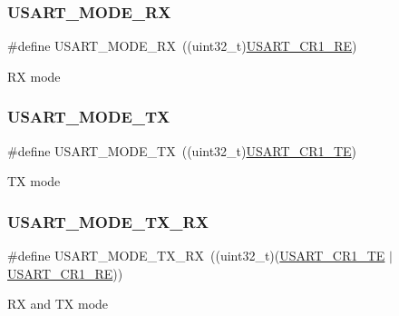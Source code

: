\subsubsection{\texorpdfstring{U\+S\+A\+R\+T\+\_\+\+M\+O\+D\+E\+\_\+\+RX}{USART\_MODE\_RX}}
{\footnotesize\ttfamily \#define U\+S\+A\+R\+T\+\_\+\+M\+O\+D\+E\+\_\+\+RX~((uint32\+\_\+t)\hyperlink{group___peripheral___registers___bits___definition_gada0d5d407a22264de847bc1b40a17aeb}{U\+S\+A\+R\+T\+\_\+\+C\+R1\+\_\+\+RE})}

RX mode \mbox{\label{group___u_s_a_r_t___mode_ga7a2fcdc3486d2675cc147811b996eb16}} 
\subsubsection{\texorpdfstring{U\+S\+A\+R\+T\+\_\+\+M\+O\+D\+E\+\_\+\+TX}{USART\_MODE\_TX}}
{\footnotesize\ttfamily \#define U\+S\+A\+R\+T\+\_\+\+M\+O\+D\+E\+\_\+\+TX~((uint32\+\_\+t)\hyperlink{group___peripheral___registers___bits___definition_gade7f090b04fd78b755b43357ecaa9622}{U\+S\+A\+R\+T\+\_\+\+C\+R1\+\_\+\+TE})}

TX mode \mbox{\label{group___u_s_a_r_t___mode_ga82418ff60ab8dac647eb7a6ba6db1284}} 
\subsubsection{\texorpdfstring{U\+S\+A\+R\+T\+\_\+\+M\+O\+D\+E\+\_\+\+T\+X\+\_\+\+RX}{USART\_MODE\_TX\_RX}}
{\footnotesize\ttfamily \#define U\+S\+A\+R\+T\+\_\+\+M\+O\+D\+E\+\_\+\+T\+X\+\_\+\+RX~((uint32\+\_\+t)(\hyperlink{group___peripheral___registers___bits___definition_gade7f090b04fd78b755b43357ecaa9622}{U\+S\+A\+R\+T\+\_\+\+C\+R1\+\_\+\+TE} $\vert$\hyperlink{group___peripheral___registers___bits___definition_gada0d5d407a22264de847bc1b40a17aeb}{U\+S\+A\+R\+T\+\_\+\+C\+R1\+\_\+\+RE}))}

RX and TX mode 